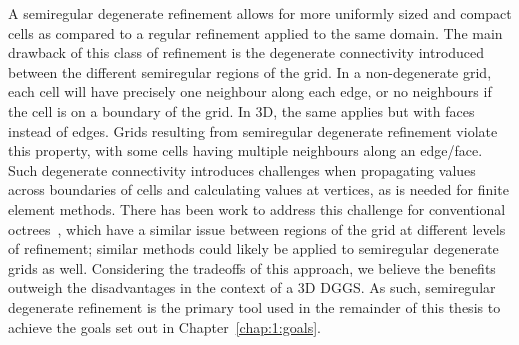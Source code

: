 A semiregular degenerate refinement allows for more uniformly sized and compact cells as compared to a regular refinement applied to the same domain.
The main drawback of this class of refinement is the degenerate connectivity introduced between the different semiregular regions of the grid.
In a non-degenerate grid, each cell will have precisely one neighbour along each edge, or no neighbours if the cell is on a boundary of the grid.
In 3D, the same applies but with faces instead of edges.
Grids resulting from semiregular degenerate refinement violate this property, with some cells having multiple neighbours along an edge/face.
Such degenerate connectivity introduces challenges when propagating values across boundaries of cells and calculating values at vertices, as is needed for finite element methods.
There has been work to address this challenge for conventional octrees~\cite{braun2008douar}, which have a similar issue between regions of the grid at different levels of refinement; similar methods could likely be applied to semiregular degenerate grids as well.
Considering the tradeoffs of this approach, we believe the benefits outweigh the disadvantages in the context of a 3D DGGS.
As such, semiregular degenerate refinement is the primary tool used in the remainder of this thesis to achieve the goals set out in Chapter~\ref{chap:1:goals}.
